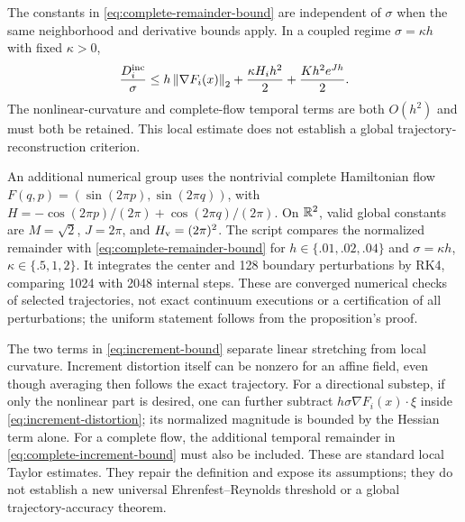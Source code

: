 The constants in \eqref{eq:complete-remainder-bound} are independent of
$\sigma$ when the same neighborhood and derivative bounds apply. In a
coupled regime $\sigma=\kappa h$ with fixed $\kappa>0$,
\begin{equation}
 \frac{D_i^{\rm inc}}{\sigma}
 \leq h\left\lVert \nabla F_i(x)\right\rVert_2
 +\frac{\kappa H_i h^2}{2}+\frac{K h^2e^{Jh}}2.
 \label{eq:coupled-width-step}
\end{equation}
The nonlinear-curvature and complete-flow temporal terms are both
$O(h^2)$ and must both be retained. This local estimate does not establish
a global trajectory-reconstruction criterion.

An additional numerical group uses the nontrivial complete Hamiltonian
flow $F(q,p)=(\sin(2\pi p),\sin(2\pi q))$, with
$H=-\cos(2\pi p)/(2\pi)+\cos(2\pi q)/(2\pi)$. On $\mathbb R^2$, valid
global constants are $M=\sqrt2$, $J=2\pi$, and
$H_{\rm v}=(2\pi)^2$. The script compares the normalized remainder with
\eqref{eq:complete-remainder-bound} for $h\in\{.01,.02,.04\}$ and
$\sigma=\kappa h$, $\kappa\in\{.5,1,2\}$. It integrates the center
and 128 boundary perturbations by RK4, comparing 1024 with 2048 internal
steps. These are converged numerical checks of selected trajectories,
not exact continuum executions or a certification of all perturbations;
the uniform statement follows from the proposition's proof.

The two terms in \eqref{eq:increment-bound} separate linear stretching
from local curvature. Increment distortion itself can be nonzero for an
affine field, even though averaging then follows the exact trajectory.
For a directional substep, if only the nonlinear part is desired, one can further subtract
$h\sigma\nabla F_i(x)\cdot\xi$ inside \eqref{eq:increment-distortion}; its
normalized magnitude is bounded by the Hessian term alone. For a complete
flow, the additional temporal remainder in
\eqref{eq:complete-increment-bound} must also be included.
These are standard local Taylor estimates. They repair the definition and
expose its assumptions; they do not establish a new universal
Ehrenfest--Reynolds threshold or a global trajectory-accuracy theorem.
